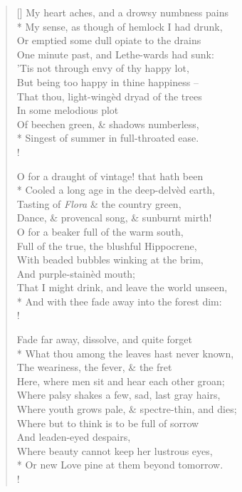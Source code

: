 \documentclass[MAIN]{subfiles}
\begin{document}
\settowidth{\versewidth}{My heart aches, and a drowsy numbness pains}
\begin{verse}[\versewidth]
My heart aches, and a drowsy numbness pains\\*
\vin My sense, as though of hemlock I had drunk,\\
Or emptied some dull opiate to the drains\\
\vin One minute past, and {\sc Lethe}-wards had sunk:\\
'Tis not through envy of thy happy lot,\\
\vin But being too happy in thine happiness --\\
\vin \vin That thou, light-wing\`ed dryad of the trees\\
\vin \vin \vin \vin In some melodious plot\\
\vin Of beechen green, \& shadows numberless,\\*
\vin \vin Singest of summer in full-throated ease.\\!

O for a draught of vintage! that hath been\\*
\vin Cooled a long age in the deep-delv\`ed earth,\\
Tasting of \emph{Flora} \& the country green,\\
\vin Dance, \& provencal song, \& sunburnt mirth!\\
O for a beaker full of the warm south,\\
\vin Full of the true, the blushful {\sc Hippocrene},\\
\vin \vin With beaded bubbles winking at the brim,\\
\vin \vin \vin \vin And purple-stain\`ed mouth;\\
\vin That I might drink, and leave the world unseen,\\*
\vin \vin And with thee fade away into the forest dim:\\!

Fade far away, dissolve, and quite forget\\*
\vin What thou among the leaves hast never known,\\
The weariness, the fever, \& the fret\\
\vin Here, where men sit and hear each other groan;\\
Where palsy shakes a few, sad, last gray hairs,\\
\vin Where youth grows pale, \& spectre-thin, and dies;\\
\vin \vin Where but to think is to be full of sorrow\\
\vin \vin \vin \vin And leaden-eyed despairs,\\
\vin Where beauty cannot keep her lustrous eyes,\\*
\vin \vin Or new Love pine at them beyond tomorrow.\\!


\end{verse}
\end{document}
